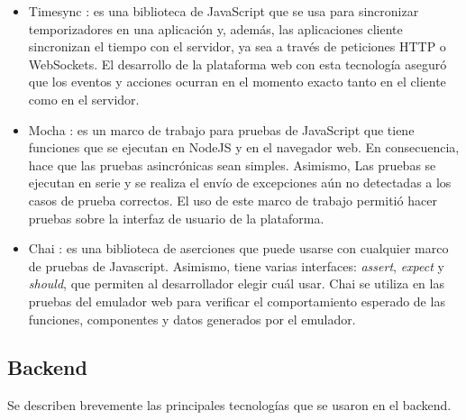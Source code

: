 \begin{itemize}
    \item Timesync \citep{Timesync}: es una biblioteca de JavaScript que se usa para sincronizar temporizadores en una aplicación y, además, las aplicaciones cliente sincronizan el tiempo con el servidor, ya sea a través de peticiones HTTP o WebSockets. El desarrollo de la plataforma web con esta tecnología aseguró que los eventos y acciones ocurran en el momento exacto tanto en el cliente como en el servidor.
    
     \item Mocha \citep{Mocha}: es un marco de trabajo para pruebas de JavaScript que tiene funciones que se ejecutan en NodeJS y en el navegador web. En consecuencia, hace que las pruebas asincrónicas sean simples. Asimismo, Las pruebas se ejecutan en serie y se realiza el envío de excepciones aún no detectadas a los casos de prueba correctos.
El uso de este marco de trabajo permitió hacer pruebas sobre la interfaz de usuario de la plataforma.
     
     \item Chai \citep{Chai}: es una biblioteca de aserciones que puede usarse con cualquier marco de pruebas de Javascript. Asimismo, tiene varias interfaces: \textit{assert}, \textit{expect} y \textit{should}, que permiten al desarrollador elegir cuál usar. Chai se utiliza en las pruebas del emulador web para  verificar el comportamiento esperado de las funciones, componentes y datos generados por el emulador. 
   
\end{itemize}


\subsection{Backend}

Se describen brevemente las principales tecnologías que se usaron en el backend.

